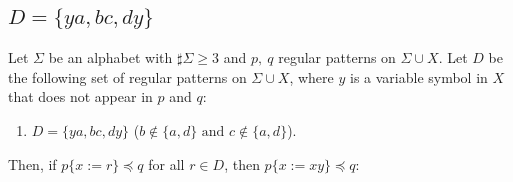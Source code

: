 
\subsection{$D = \{ ya, bc, dy \}$}\label{subsec:d3}

\newcommand{\TheConditionA}{$b \not\in \{a,d\} \mbox{~and~} c \not\in \{a,d\}$}
\newcommand{\TheConditionB}{$b = a,~b \not= d, \mbox{~and~} c \not\in \{a,d\}$}
\newcommand{\TheConditionBsub}{$c \not\in \{a,d\}$}
\newcommand{\TheConditionC}{$b \not\in \{a, d\},~c \not= a, \mbox{~and~} c = d$}

\begin{lem}\label{lem:addpart}
  Let $\Sigma$ be an alphabet with $\sharp\Sigma \ge 3$ and $p,~q$ regular patterns on $\Sigma\cup X$.
  Let $D$ be the following set of regular patterns on $\Sigma\cup X$, where $y$ is a variable symbol in $X$ that does not appear in $p$ and $q$:
  \begin{enumerate}
  \item[] $D = \{ ya, bc, dy \}$ (\TheConditionA).
  \end{enumerate}
  Then, if $p \{ x := r \} \preceq q$ for all $r \in D$, then $p \{ x := xy \} \preceq q$:
\end{lem}

